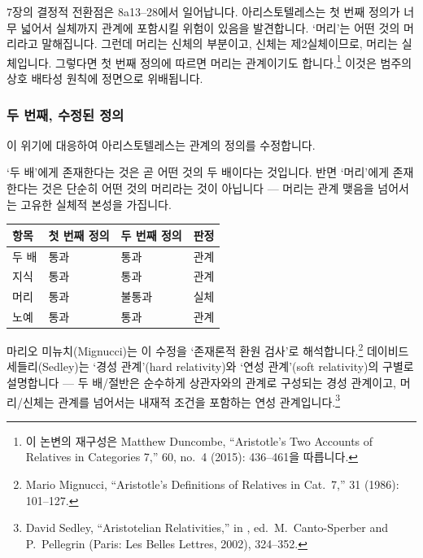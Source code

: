 \documentclass[12pt, a4paper]{article}
\begin{document}
7장의 결정적 전환점은 8a13--28에서 일어납니다. 아리스토텔레스는 첫 번째 정의가 너무 넓어서 실체까지 관계에 포함시킬 위험이 있음을 발견합니다. `머리'는 어떤 것의 머리라고 말해집니다. 그런데 머리는 신체의 부분이고, 신체는 제2실체이므로, 머리는 실체입니다. 그렇다면 첫 번째 정의에 따르면 머리는 관계이기도 합니다.\footnote{이 논변의 재구성은 Matthew Duncombe, ``Aristotle's Two Accounts of Relatives in Categories 7,''  60, no.\ 4 (2015): 436--461을 따릅니다.} 이것은 범주의 상호 배타성 원칙에 정면으로 위배됩니다.

\subsubsection{두 번째, 수정된 정의}

이 위기에 대응하여 아리스토텔레스는 관계의 정의를 수정합니다.


`두 배'에게 존재한다는 것은 곧 어떤 것의 두 배이다는 것입니다. 반면 `머리'에게 존재한다는 것은 단순히 어떤 것의 머리라는 것이 아닙니다 --- 머리는 관계 맺음을 넘어서는 고유한 실체적 본성을 가집니다.

{%
\footnotesize
\setlength{\extrarowheight}{1.5pt}%
\renewcommand{\arraystretch}{1.1}%
\setlength{\tabcolsep}{3pt}%
%
\noindent\centering
\begin{tabular}{|>{\centering\arraybackslash}m{14mm}|>{\centering\arraybackslash}m{30mm}|>{\centering\arraybackslash}m{30mm}|>{\centering\arraybackslash}m{30mm}|}
\hline
\rowcolor{tableheadblue}
{\color{h1navy}\bfseries 항목} &
{\color{h1navy}\bfseries 첫 번째 정의} &
{\color{h1navy}\bfseries 두 번째 정의} &
{\color{h1navy}\bfseries 판정} \\ \hline
두 배 & 통과 & 통과 & 관계 \\ \hline
지식 & 통과 & 통과 & 관계 \\ \hline
머리 & 통과 & 불통과 & 실체 \\ \hline
노예 & 통과 & 통과 & 관계 \\ \hline
\end{tabular}
\par
}

마리오 미뉴치(Mignucci)는 이 수정을 `존재론적 환원 검사'로 해석합니다.\footnote{Mario Mignucci, ``Aristotle's Definitions of Relatives in Cat.\ 7,''  31 (1986): 101--127.} 데이비드 세들리(Sedley)는 `경성 관계'(hard relativity)와 `연성 관계'(soft relativity)의 구별로 설명합니다 --- 두 배/절반은 순수하게 상관자와의 관계로 구성되는 경성 관계이고, 머리/신체는 관계를 넘어서는 내재적 조건을 포함하는 연성 관계입니다.\footnote{David Sedley, ``Aristotelian Relativities,'' in , ed.\ M.\ Canto-Sperber and P.\ Pellegrin (Paris: Les Belles Lettres, 2002), 324--352.}
\end{document}
